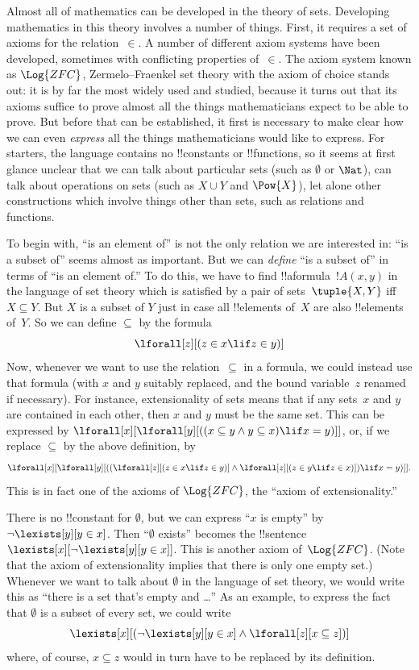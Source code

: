 \documentclass[../../../include/open-logic-section]{subfiles}
\begin{document}


Almost all of mathematics can be developed in the theory of sets.
Developing mathematics in this theory involves a number of things.
First, it requires a set of axioms for the relation~$\in$.  A number
of different axiom systems have been developed, sometimes with
conflicting properties of~$\in$.  The axiom system known as
$\Log{ZFC}$, Zermelo--Fraenkel set theory with the axiom of choice
stands out: it is by far the most widely used and studied, because it
turns out that its axioms suffice to prove almost all the things
mathematicians expect to be able to prove.  But before that can be
established, it first is necessary to make clear how we can even
\emph{express} all the things mathematicians would like to express.
For starters, the language contains no !!{constant}s or !!{function}s,
so it seems at first glance unclear that we can talk about particular
sets (such as $\emptyset$ or $\Nat$), can talk about operations on
sets (such as $X \cup Y$ and $\Pow{X}$), let alone other
constructions which involve things other than sets, such as relations
and functions.

To begin with, ``is an element of'' is not the only relation we are
interested in: ``is a subset of'' seems almost as important.  But we
can \emph{define} ``is a subset of'' in terms of ``is an element of.''
To do this, we have to find !!a{formula}~$!A(x, y)$ in
the language of set theory which is satisfied by a pair of
sets~$\tuple{X, Y}$ iff $X \subseteq Y$.  But $X$ is a subset of $Y$
just in case all !!{element}s of~$X$ are also !!{element}s of~$Y$.  So
we can define $\subseteq$ by the formula
\[
\lforall[z][(z \in x \lif z \in y)]
\]
Now, whenever we want to use the relation~$\subseteq$ in a formula, we
could instead use that formula (with $x$ and $y$ suitably replaced,
and the bound variable~$z$ renamed if necessary).  For instance,
extensionality of sets means that if any sets~$x$ and $y$ are
contained in each other, then $x$ and $y$ must be the same set. This
can be expressed by $\lforall[x][\lforall[y][((x \subseteq y \land y
    \subseteq x) \lif x = y)]]$, or, if we replace $\subseteq$ by the
above definition, by
\[
\lforall[x][\lforall[y][((\lforall[z][(z \in x \lif z \in y)] \land
    \lforall[z][(z \in y \lif z \in x)]) \lif x = y)]].
\]
This is in fact one of the axioms of $\Log{ZFC}$, the ``axiom of
extensionality.''

There is no !!{constant} for $\emptyset$, but we can express ``$x$ is
empty'' by $\lnot \lexists[y][y \in x]$.  Then ``$\emptyset$ exists''
becomes the !!{sentence}~$\lexists[x][\lnot \lexists[y][y \in
    x]]$. This is another axiom of~$\Log{ZFC}$.  (Note that the axiom
of extensionality implies that there is only one empty set.)  Whenever
we want to talk about $\emptyset$ in the language of set theory, we
would write this as ``there is a set that's empty and \dots'' As an
example, to express the fact that $\emptyset$ is a subset of every
set, we could write
\[
\lexists[x][(\lnot\lexists[y][y \in x] \land \lforall[z][x \subseteq
    z])]
\]
where, of course, $x \subseteq z$ would in turn have to be replaced by
its definition.
\end{document}
